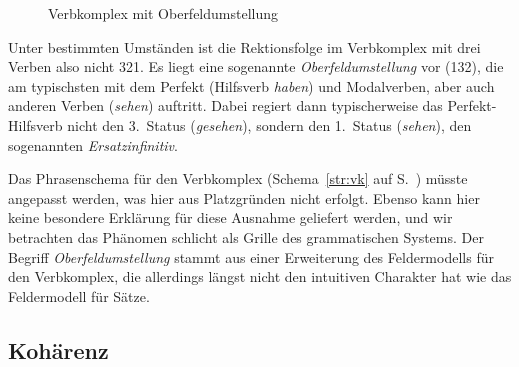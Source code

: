 \begin{exe}
\end{exe}

\begin{figure}[!htbp]
  \centering
  \caption{Verbkomplex mit Oberfeldumstellung}
  \label{fig:oberfeldum}
\end{figure}

Unter bestimmten Umständen ist die Rektionsfolge im Verbkomplex mit drei Verben also nicht 321.
Es liegt eine sogenannte \textit{Oberfeldumstellung} vor (132), die am typischsten mit dem Perfekt (Hilfsverb \textit{haben}) und Modalverben, aber auch anderen Verben (\zB \textit{sehen}) auftritt.
Dabei regiert dann typischerweise das Perfekt-Hilfsverb nicht den 3.~Status (\textit{gesehen}), sondern den 1.~Status (\textit{sehen}), den sogenannten \textit{Ersatzinfinitiv}.


Das Phrasenschema für den Verbkomplex (Schema~\ref{str:vk} auf S.~\pageref{str:vk}) müsste angepasst werden, was hier aus Platzgründen nicht erfolgt.
Ebenso kann hier keine besondere Erklärung für diese Ausnahme geliefert werden, und wir betrachten das Phänomen schlicht als Grille des grammatischen Systems.
Der Begriff \textit{Oberfeldumstellung} stammt aus einer Erweiterung des Feldermodells für den Verbkomplex, die allerdings längst nicht den intuitiven Charakter hat wie das Feldermodell für Sätze.

\subsection{Kohärenz}

